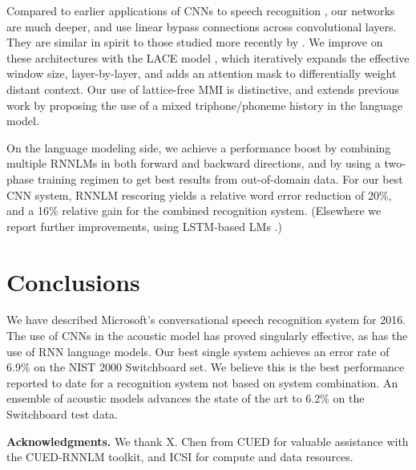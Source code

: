 \documentclass{article}
\begin{document}
Compared to earlier applications of CNNs to speech recognition
\cite{sainath2013deep,abdel2012applying}, our networks are 
much deeper, and use linear bypass connections across convolutional
layers. They are similar in spirit to those studied more recently by
\cite{sercu2016very,saon2015ibm,saonSRK16,bi2015very,qian2016very}. We improve on these 
architectures with the LACE model \cite{yu2016deep}, which iteratively
expands the effective window size, layer-by-layer, and adds an
attention mask to differentially weight distant context. Our use of 
lattice-free MMI is distinctive, and extends previous work
\cite{chen2006advances,povey2016purely} by proposing the use of a mixed
triphone/phoneme history in the language model.

On the language modeling side, we achieve a performance boost by combining multiple RNNLMs
in both forward and backward directions, and by using a two-phase training regimen to get
best results from out-of-domain data.
For our best CNN system, RNNLM rescoring yields a relative word error reduction of 20\%,
and a 16\% relative gain for the combined recognition system.
(Elsewhere we report further improvements, using LSTM-based LMs \cite{parity-techreport}.)


\section{Conclusions}
\label{sec:concl}

We have described Microsoft's conversational speech recognition system
for 2016. 
The use of CNNs in the acoustic model has proved singularly effective,
as has the use of RNN language models.
Our best single system
achieves an error rate of 6.9\% on the NIST 2000 Switchboard set. We believe
this is the best performance reported to date for a recognition system not based on system combination. 
An ensemble of acoustic models advances the state of the art to 6.2\% on the Switchboard test data.

{\bf Acknowledgments.}
We thank X. Chen from CUED for valuable assistance with the CUED-RNNLM toolkit,
and ICSI for compute and data resources.















{\footnotesize


}
\end{document}
